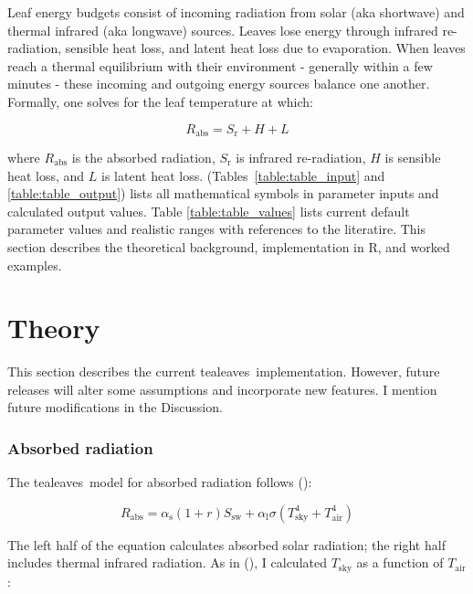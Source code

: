 \documentclass[11pt, oneside]{article}
\newcommand{\pkg}[1]{{\fontseries{b}\selectfont #1}}
\newcommand{\tealeaves}{\pkg{tealeaves}}
\begin{document}
Leaf energy budgets consist of incoming radiation from solar (aka shortwave) and thermal infrared (aka longwave) sources. Leaves lose energy through infrared re-radiation, sensible heat loss, and latent heat loss due to evaporation. When leaves reach a thermal equilibrium with their environment - generally within a few minutes - these incoming and outgoing energy sources balance one another. Formally, one solves for the leaf temperature at which:

\begin{equation}
  \label{eq:energy_budget}
  R_\mathrm{abs} = S_\mathrm{r} + H + L
\end{equation}

where $R_\mathrm{abs}$ is the absorbed radiation, $S_\mathrm{r}$ is infrared re-radiation, $H$ is sensible heat loss, and $L$ is latent heat loss. (Tables~\ref{table:table_input} and \ref{table:table_output}) lists all mathematical symbols in parameter inputs and calculated output values. Table \ref{table:table_values} lists current default parameter values and realistic ranges with references to the literatire. This section describes the theoretical background, implementation in R, and worked examples.

\section*{Theory}

This section describes the current \tealeaves~implementation. However, future releases will alter some assumptions and incorporate new features. I mention future modifications in the Discussion.

\subsubsection*{Absorbed radiation}

The \tealeaves~model for absorbed radiation follows \citeauthor{Okajima_etal_2012} (\citeyear{Okajima_etal_2012}):

\begin{equation}
  R_\mathrm{abs} = \alpha_\mathrm{s} (1 + r) S_\mathrm{sw} + \alpha_\mathrm{l} \sigma (T_\mathrm{sky} ^ 4 + T_\mathrm{air} ^ 4)
\end{equation}

The left half of the equation calculates absorbed solar radiation; the right half includes thermal infrared radiation. As in \citeauthor{Okajima_etal_2012} (\citeyear{Okajima_etal_2012}), I calculated $T_\mathrm{sky}$ as a function of $T_\mathrm{air}$:
\end{document}
